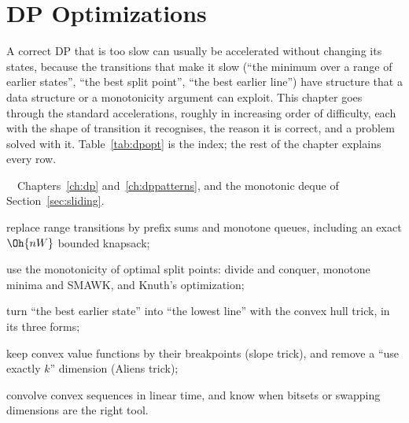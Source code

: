 \chapter{DP Optimizations}\label{ch:dpopt}

A correct DP that is too slow can usually be accelerated without changing its states, because the transitions that make it slow
(``the minimum over a range of earlier states'', ``the best split point'', ``the best earlier line'') have structure that a data
structure or a monotonicity argument can exploit. This chapter goes through the standard accelerations, roughly in increasing order of
difficulty, each with the shape of transition it recognises, the reason it is correct, and a problem solved with it.
Table~\ref{tab:dpopt} is the index; the rest of the chapter explains every row.

\begin{chapterintro}{\gold\ \plat\ \ioi}{Chapters~\ref{ch:dp} and~\ref{ch:dppatterns}, and the monotonic deque of
Section~\ref{sec:sliding}.}
  \item replace range transitions by prefix sums and monotone queues, including an exact $\Oh{nW}$ bounded knapsack;
  \item use the monotonicity of optimal split points: divide and conquer, monotone minima and SMAWK, and Knuth's optimization;
  \item turn ``the best earlier state'' into ``the lowest line'' with the convex hull trick, in its three forms;
  \item keep convex value functions by their breakpoints (slope trick), and remove a ``use exactly $k$'' dimension (Aliens trick);
  \item convolve convex sequences in linear time, and know when bitsets or swapping dimensions are the right tool.
\end{chapterintro}

